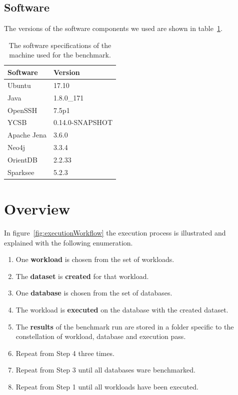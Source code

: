 \subsection{Software}
The versions of the software components we used are shown in table~\ref{tab:software}.

\begin{table}[!h]
  \begin{minipage}{\textwidth}
    \begin{tabularx}{\textwidth}{ | X | X | }
      \hline
      Software & Version \\ \hline \hline
      Ubuntu & 17.10 \\ \hline
      Java & 1.8.0\_171 \\ \hline
      OpenSSH & 7.5p1 \\ \hline
      YCSB & 0.14.0-SNAPSHOT \\ \hline
      Apache Jena & 3.6.0 \\ \hline
      Neo4j & 3.3.4 \\ \hline
      OrientDB & 2.2.33 \\ \hline
      Sparksee & 5.2.3 \\ \hline
    \end{tabularx}
  \end{minipage}
  \caption{The software specifications of the machine used for the benchmark.}
  \label{tab:software}
\end{table}

\section{Overview}
\label{ch:evaluation:se:overview}
In figure~\ref{fig:executionWorkflow} the execution process is illustrated and explained with the following enumeration.

\begin{enumerate}[label=Step \arabic*:,widest=Step 1,leftmargin=*]
  \item One \textbf{workload} is chosen from the set of workloads.
  \item The \textbf{dataset} is \textbf{created} for that workload.
  \item One \textbf{database} is chosen from the set of databases.
  \item The workload is \textbf{executed} on the database with the created dataset.
  \item The \textbf{results} of the benchmark run are stored in a folder specific to the constellation of workload,
  database and execution pass.
  \item Repeat from Step 4 three times.
  \item Repeat from Step 3 until all databases ware benchmarked.
  \item Repeat from Step 1 until all workloads have been executed.
\end{enumerate}

